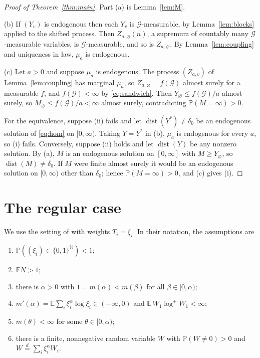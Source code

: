 \documentclass[11pt]{amsart}
\theoremstyle{remark}
\newcommand{\Ga}{\mathcal{G}}
\newcommand{\N}{\mathbb{N}}
\newcommand{\Pb}{\mathbb{P}}
\newcommand{\E}{\mathbb{E}}
\newcommand{\dist}{\operatorname{dist}}
\begin{document}
\begin{proof}[Proof of Theorem~\ref{thm:main}]
Part (a) is Lemma~\ref{lem:M}.

(b) If $(Y_v)$ is endogenous then each $Y_v$ is $\Ga$-measurable, by Lemma~\ref{lem:blocks}
applied to the shifted process. Then $Z_{a,\varnothing}(n)$, a supremum of countably many
$\Ga$-measurable variables, is $\Ga$-measurable, and so is $Z_{a,\varnothing}$. By
Lemma~\ref{lem:coupling} and uniqueness in law, $\mu_a$ is endogenous.

(c) Let $a>0$ and suppose $\mu_a$ is endogenous. The process $(Z_{a,v})$ of
Lemma~\ref{lem:coupling} has marginal $\mu_a$, so $Z_{a,\varnothing}=f(\Ga)$ almost surely
for a measurable $f$, and $f(\Ga)<\infty$ by \eqref{eq:sandwich}. Then
$Y_\varnothing\le f(\Ga)/a$ almost surely, so $M_\varnothing\le f(\Ga)/a<\infty$ almost
surely, contradicting $\Pb(M=\infty)>0$.

For the equivalence, suppose (ii) fails and let $\dist(Y^*)\ne\delta_0$ be an endogenous
solution of \eqref{eq:hom} on $[0,\infty)$. Taking $Y=Y^*$ in (b), $\mu_a$ is endogenous for
every $a$, so (i) fails. Conversely, suppose (ii) holds and let $\dist(Y)$ be any nonzero
solution. By (a), $M$ is an endogenous solution on $[0,\infty]$ with $M\ge Y_\varnothing$,
so $\dist(M)\ne\delta_0$. If $M$ were finite almost surely it would be an endogenous
solution on $[0,\infty)$ other than $\delta_0$; hence $\Pb(M=\infty)>0$, and (c) gives (i).
\end{proof}

\section{The regular case}\label{sec:regular}

We use the setting of \cite{ABM} with weights $T_i=\xi_i$. In their notation, the
assumptions are
\begin{enumerate}
\item[(A1)] $\Pb((\xi_i)\in\{0,1\}^{\N})<1$;
\item[(A2)] $\E N>1$;
\item[(A3)] there is $\alpha>0$ with $1=m(\alpha)<m(\beta)$ for all $\beta\in[0,\alpha)$;
\item[(A4a)] $m'(\alpha)=\E\sum_i\xi_i^{\alpha}\log\xi_i\in(-\infty,0)$ and
$\E\,W_1\log^+W_1<\infty$;
\item[(A4b)] $m(\theta)<\infty$ for some $\theta\in[0,\alpha)$;
\item[(A5)] there is a finite, nonnegative random variable $W$ with $\Pb(W\ne0)>0$ and
$W\stackrel{d}{=}\sum_i\xi_i^{\alpha}W_i$.
\end{enumerate}
\end{document}
